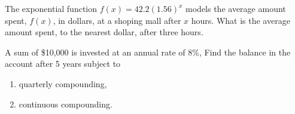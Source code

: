\begin{exercise}
The exponential function $f(x)=42.2(1.56)^x$ models the average amount spent, $f(x)$, in dollars, at a shoping mall after $x$ hours. What is the average amount spent, to the nearest dollar, after three hours.
\end{exercise}

\iffalse
\begin{exercise}
A car is depreciating according the formula: $V=25000(3.2)^{-0.05x}$ where $x$ is the age of the car in years. Find the value of the car when it is five years old. 
\end{exercise}
\fi


\begin{exercise}
A sum of \$10,000 is invested at an annual rate of 8\%, Find the balance in the account after 5 years subject to 
\begin{enumerate}
\item quarterly compounding,
\item continuous compounding.
\end{enumerate}
\end{exercise}


\iffalse
\begin{exercise}
A sum of \$20,000 is invested at an annual rate of 5.5\%, Find the balance in the account after 5 years subject to 
\begin{enumerate}
\item mothly compounding,
\item continuous compounding.
\end{enumerate}
\end{exercise}
\fi


